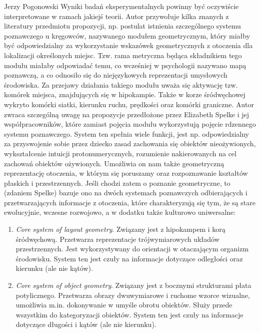 \begin{newrevengenv}{Jerzy Pogonowski}
Wyniki badań eksperymentalnych powinny być oczywiście
interpretowane w ramach jakiejś teorii. Autor przywołuje kilka
znanych z literatury przedmiotu propozycji, np. postulat istnienia
szczególnego systemu poznawczego u kręgowców, nazywanego modułem
geometrycznym, który miałby być odpowiedzialny za wykorzystanie
wskazówek geometrycznych z otoczenia dla lokalizacji określonych
miejsc. Tzw. rama metryczna będąca składnikiem tego modułu miałaby
odpowiadać temu, co wcześniej w psychologii nazywano mapą
poznawczą, a co odnosiło się do niejęzykowych reprezentacji
umysłowych środowiska. Za przejawy działania takiego modułu uważa
się aktywację tzw. komórek miejsca, znajdujących się w hipokampie.
Także w korze śródwęchowej wykryto komórki siatki, kierunku ruchu,
prędkości oraz komórki graniczne. Autor zwraca szczególną uwagę na
propozycje przedłożone przez Elizabeth Spelke i jej
współpracowników, które zamiast pojęcia modułu wykorzystują
pojęcie rdzennego systemu poznawczego. System ten spełnia wiele
funkcji, jest np. odpowiedzialny za przyswojenie sobie przez
dziecko zasad zachowania się obiektów nieożywionych, wykształcenie
intuicji protonumerycznych, rozumienie nakierowanych na cel
zachowań obiektów ożywionych. Umożliwia on nam także geometryczną
reprezentację otoczenia, w którym się poruszamy oraz rozpoznawanie
kształtów płaskich i przestrzennych. Jeśli chodzi zatem o poznanie
geometryczne, to (zdaniem Spelke) bazuje ono na dwóch systemach
poznawczych odbierających i przetwarzających informacje z
otoczenia, które charakteryzują się tym, że są stare ewolucyjnie,
wczesne rozwojowo, a w dodatku także kulturowo uniwersalne:

\begin{enumerate}

\item {\em Core system of layout geometry}. Związany jest z
hipokampem i korą śródwęchową. Przetwarza reprezentacje
trójwymiarowych układów przestrzennych. Jest wykorzystywany do
orientacji w otaczającym organizm środowisku. System ten jest
czuły na informacje dotyczące odległości oraz kierunku (ale nie
kątów).

\item {\em Core system of object geometry}. Związany jest z
bocznymi strukturami płata potylicznego. Przetwarza obrazy
dwuwymiarowe i ruchome wzorce wizualne, umożliwia m.in.
dokonywanie w umyśle obrotu obiektów. Służy przede wszystkim do
kategoryzacji obiektów. System ten jest czuły na informacje
dotyczące długości i kątów (ale nie kierunku).


\end{enumerate}
\end{newrevengenv}
